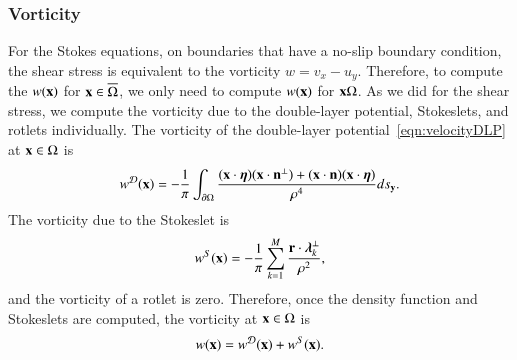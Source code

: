 \documentclass[preprint, 10pt]{elsarticle}
\begin{document}
\subsubsection{Vorticity}
For the Stokes equations, on boundaries that have a no-slip boundary
condition, the shear stress is equivalent to the vorticity $w = v_x -
u_y$.  Therefore, to compute the $w({\mathbf{x}})$ for ${\mathbf{x}} \in
\overline{\Omega}$, we only need to compute $w({\mathbf{x}})$ for ${\mathbf{x}}\Omega$.
As we did for the shear stress, we compute the vorticity due to the
double-layer potential, Stokeslets, and rotlets individually.  The
vorticity of the double-layer potential~\eqref{eqn:velocityDLP} at
${\mathbf{x}} \in \Omega$ is
\begin{align}
  w^{{\mathcal{D}}}({\mathbf{x}}) = -\frac{1}{\pi}\int_{{\partial}\Omega} 
    \frac{({\mathbf{x}} \cdot {\boldsymbol\eta})({\mathbf{x}} \cdot {\mathbf{n}}^\perp) + 
    ({\mathbf{x}} \cdot {\mathbf{n}})({\mathbf{x}} \cdot {\boldsymbol\eta})}{\rho^4}ds_{{\mathbf{y}}}.
  \label{eqn:vorticityDLP}
\end{align}
The vorticity due to the Stokeslet is
\begin{align*}
  w^S({\mathbf{x}}) = -\frac{1}{\pi} \sum_{k=1}^{M} 
    \frac{{\mathbf{r}} \cdot {\boldsymbol\lambda}_k^\perp}{\rho^2},
\end{align*}
and the vorticity of a rotlet is zero.  Therefore, once the density
function and Stokeslets are computed, the vorticity at ${\mathbf{x}} \in \Omega$
is
\begin{align*}
  w({\mathbf{x}}) = w^{\mathcal{D}}({\mathbf{x}}) + w^S({\mathbf{x}}).
\end{align*}


\end{document}
